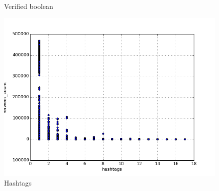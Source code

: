 \begin{figure}[H]
    \caption{Verified boolean}
\endminipage\hfill
{}
    \centering
    \includegraphics[width=\linewidth]{img/hashtags.png}
    \caption{Hashtags}
\endminipage\hfill
\end{figure}

